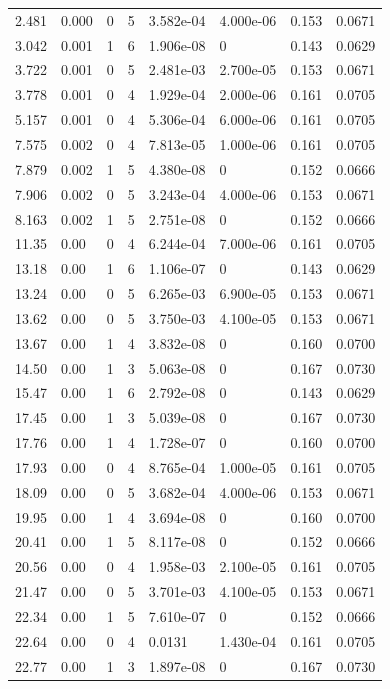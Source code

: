 \documentclass[preview]{standalone}
\begin{document}
{{\begin{tabular}{L{1.2cm}C{1.2cm} C{0.3cm}C{0.5cm} C{1.4cm}C{1.4cm} C{1.4cm}C{1.4cm}}
  2.481  &  0.000  & 0     &  5 &  3.582e-04  & 4.000e-06  & 0.153 &  0.0671   \\ 
  3.042  &  0.001  & 1     &  6 &  1.906e-08  & 0  & 0.143 &  0.0629   \\ 
  3.722  &  0.001  & 0     &  5 &  2.481e-03  & 2.700e-05  & 0.153 &  0.0671   \\ 
  3.778  &  0.001  & 0     &  4 &  1.929e-04  & 2.000e-06  & 0.161 &  0.0705   \\ 
  5.157  &  0.001  & 0     &  4 &  5.306e-04  & 6.000e-06  & 0.161 &  0.0705   \\ 
  7.575  &  0.002  & 0     &  4 &  7.813e-05  & 1.000e-06  & 0.161 &  0.0705   \\ 
  7.879  &  0.002  & 1     &  5 &  4.380e-08  & 0  & 0.152 &  0.0666   \\ 
  7.906  &  0.002  & 0     &  5 &  3.243e-04  & 4.000e-06  & 0.153 &  0.0671   \\ 
  8.163  &  0.002  & 1     &  5 &  2.751e-08  & 0  & 0.152 &  0.0666   \\ 
  11.35  &  0.00  & 0     &  4 &  6.244e-04  & 7.000e-06  & 0.161 &  0.0705   \\ 
  13.18  &  0.00  & 1     &  6 &  1.106e-07  & 0  & 0.143 &  0.0629   \\ 
  13.24  &  0.00  & 0     &  5 &  6.265e-03  & 6.900e-05  & 0.153 &  0.0671   \\ 
  13.62  &  0.00  & 0     &  5 &  3.750e-03  & 4.100e-05  & 0.153 &  0.0671   \\ 
  13.67  &  0.00  & 1     &  4 &  3.832e-08  & 0  & 0.160 &  0.0700   \\ 
  14.50  &  0.00  & 1     &  3 &  5.063e-08  & 0  & 0.167 &  0.0730   \\ 
  15.47  &  0.00  & 1     &  6 &  2.792e-08  & 0  & 0.143 &  0.0629   \\ 
  17.45  &  0.00  & 1     &  3 &  5.039e-08  & 0  & 0.167 &  0.0730   \\ 
  17.76  &  0.00  & 1     &  4 &  1.728e-07  & 0  & 0.160 &  0.0700   \\ 
  17.93  &  0.00  & 0     &  4 &  8.765e-04  & 1.000e-05  & 0.161 &  0.0705   \\ 
  18.09  &  0.00  & 0     &  5 &  3.682e-04  & 4.000e-06  & 0.153 &  0.0671   \\ 
  19.95  &  0.00  & 1     &  4 &  3.694e-08  & 0  & 0.160 &  0.0700   \\ 
  20.41  &  0.00  & 1     &  5 &  8.117e-08  & 0  & 0.152 &  0.0666   \\ 
  20.56  &  0.00  & 0     &  4 &  1.958e-03  & 2.100e-05  & 0.161 &  0.0705   \\ 
  21.47  &  0.00  & 0     &  5 &  3.701e-03  & 4.100e-05  & 0.153 &  0.0671   \\ 
  22.34  &  0.00  & 1     &  5 &  7.610e-07  & 0  & 0.152 &  0.0666   \\ 
  22.64  &  0.00  & 0     &  4 &  0.0131  & 1.430e-04  & 0.161 &  0.0705   \\ 
  22.77  &  0.00  & 1     &  3 &  1.897e-08  & 0  & 0.167 &  0.0730   \\ 
\hline 
\end{tabular} 

}}
\end{document}

